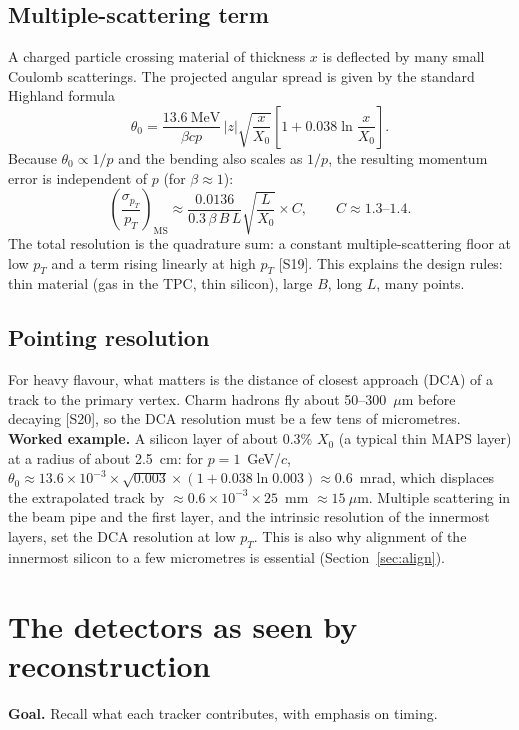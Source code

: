 \documentclass[11pt,letterpaper]{article}
\newcommand{\goal}[1]{\par\noindent\textbf{Goal.} #1\par}
\begin{document}
\subsection{Multiple-scattering term}
A charged particle crossing material of thickness $x$ is deflected by many small Coulomb scatterings. The projected angular spread is given by the standard Highland formula
\begin{equation}
\theta_0 = \frac{13.6~\mathrm{MeV}}{\beta c p}\,|z|\sqrt{\frac{x}{X_0}}\left[1+0.038\ln\frac{x}{X_0}\right].
\end{equation}
Because $\theta_0\propto1/p$ and the bending also scales as $1/p$, the resulting momentum error is independent of $p$ (for $\beta\approx1$):
\begin{equation}
\left(\frac{\sigma_{p_T}}{p_T}\right)_{\mathrm{MS}} \approx \frac{0.0136}{0.3\,\beta\,B\,L}\sqrt{\frac{L}{X_0}}\times C, \qquad C\approx1.3\text{--}1.4.
\end{equation}
The total resolution is the quadrature sum: a constant multiple-scattering floor at low $p_T$ and a term rising linearly at high $p_T$ [S19].
This explains the design rules: thin material (gas in the TPC, thin silicon), large $B$, long $L$, many points.

\subsection{Pointing resolution}
For heavy flavour, what matters is the distance of closest approach (DCA) of a track to the primary vertex. Charm hadrons fly about 50--300~$\mu$m before decaying [S20], so the DCA resolution must be a few tens of micrometres.
\textbf{Worked example.} A silicon layer of about 0.3\% $X_0$ (a typical thin MAPS layer) at a radius of about 2.5~cm: for $p=1$~GeV/$c$,
$\theta_0\approx13.6\times10^{-3}\times\sqrt{0.003}\times(1+0.038\ln0.003)\approx0.6$~mrad, which displaces the extrapolated track by $\approx0.6\times10^{-3}\times25$~mm $\approx15~\mu$m.
Multiple scattering in the beam pipe and the first layer, and the intrinsic resolution of the innermost layers, set the DCA resolution at low $p_T$.
This is also why alignment of the innermost silicon to a few micrometres is essential (Section~\ref{sec:align}).

\section{The detectors as seen by reconstruction}
\goal{Recall what each tracker contributes, with emphasis on timing.}
\end{document}
